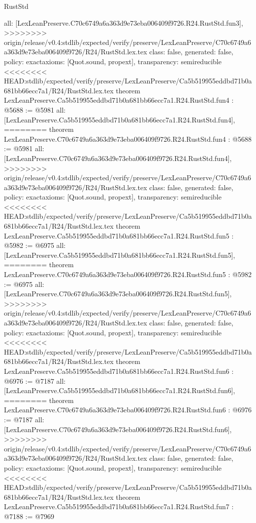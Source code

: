 \begin{lexlean}{RustStd}
\begin{coremodule}
{\begin{coremodule}
{{{{{{{  all: [LexLeanPreserve.C70c6749a6a363d9e73eba006409f9726.R24.RustStd.fun3],
>>>>>>>> origin/release/v0.4:stdlib/expected/verify/preserve/LexLeanPreserve/C70c6749a6a363d9e73eba006409f9726/R24/RustStd.lex.tex
  class: false,
  generated: false,
  policy: exact{axioms: [Quot.sound, propext]},
  transparency: semireducible
}
<<<<<<<< HEAD:stdlib/expected/verify/preserve/LexLeanPreserve/Ca5b519955eddbd71b0a681bb66ecc7a1/R24/RustStd.lex.tex
theorem LexLeanPreserve.Ca5b519955eddbd71b0a681bb66ecc7a1.R24.RustStd.fun4 : @5688 := @5981 {
  all: [LexLeanPreserve.Ca5b519955eddbd71b0a681bb66ecc7a1.R24.RustStd.fun4],
========
theorem LexLeanPreserve.C70c6749a6a363d9e73eba006409f9726.R24.RustStd.fun4 : @5688 := @5981 {
  all: [LexLeanPreserve.C70c6749a6a363d9e73eba006409f9726.R24.RustStd.fun4],
>>>>>>>> origin/release/v0.4:stdlib/expected/verify/preserve/LexLeanPreserve/C70c6749a6a363d9e73eba006409f9726/R24/RustStd.lex.tex
  class: false,
  generated: false,
  policy: exact{axioms: [Quot.sound, propext]},
  transparency: semireducible
}
<<<<<<<< HEAD:stdlib/expected/verify/preserve/LexLeanPreserve/Ca5b519955eddbd71b0a681bb66ecc7a1/R24/RustStd.lex.tex
theorem LexLeanPreserve.Ca5b519955eddbd71b0a681bb66ecc7a1.R24.RustStd.fun5 : @5982 := @6975 {
  all: [LexLeanPreserve.Ca5b519955eddbd71b0a681bb66ecc7a1.R24.RustStd.fun5],
========
theorem LexLeanPreserve.C70c6749a6a363d9e73eba006409f9726.R24.RustStd.fun5 : @5982 := @6975 {
  all: [LexLeanPreserve.C70c6749a6a363d9e73eba006409f9726.R24.RustStd.fun5],
>>>>>>>> origin/release/v0.4:stdlib/expected/verify/preserve/LexLeanPreserve/C70c6749a6a363d9e73eba006409f9726/R24/RustStd.lex.tex
  class: false,
  generated: false,
  policy: exact{axioms: [Quot.sound, propext]},
  transparency: semireducible
}
<<<<<<<< HEAD:stdlib/expected/verify/preserve/LexLeanPreserve/Ca5b519955eddbd71b0a681bb66ecc7a1/R24/RustStd.lex.tex
theorem LexLeanPreserve.Ca5b519955eddbd71b0a681bb66ecc7a1.R24.RustStd.fun6 : @6976 := @7187 {
  all: [LexLeanPreserve.Ca5b519955eddbd71b0a681bb66ecc7a1.R24.RustStd.fun6],
========
theorem LexLeanPreserve.C70c6749a6a363d9e73eba006409f9726.R24.RustStd.fun6 : @6976 := @7187 {
  all: [LexLeanPreserve.C70c6749a6a363d9e73eba006409f9726.R24.RustStd.fun6],
>>>>>>>> origin/release/v0.4:stdlib/expected/verify/preserve/LexLeanPreserve/C70c6749a6a363d9e73eba006409f9726/R24/RustStd.lex.tex
  class: false,
  generated: false,
  policy: exact{axioms: [Quot.sound, propext]},
  transparency: semireducible
}
<<<<<<<< HEAD:stdlib/expected/verify/preserve/LexLeanPreserve/Ca5b519955eddbd71b0a681bb66ecc7a1/R24/RustStd.lex.tex
theorem LexLeanPreserve.Ca5b519955eddbd71b0a681bb66ecc7a1.R24.RustStd.fun7 : @7188 := @7969 {
}}}}}}}}}}
\end{coremodule}}
\end{coremodule}
\end{lexlean}
